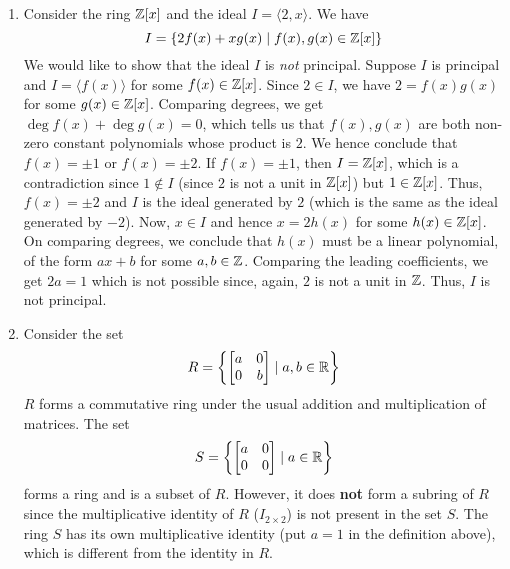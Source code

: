 \begin{ex}
\begin{enumerate}
    \item Consider the ring $\mathbb{Z}[x]$ and the ideal $I = \langle 2,x \rangle$. We have
    \[
        I = \left\{ 2 f(x) + x g(x) \mid f(x), g(x) \in \mathbb{Z}[x] \right\}
    \]
    We would like to show that the ideal $I$ is \emph{not} principal. Suppose $I$ is principal and $I = \langle f(x) \rangle$ for some $f(x) \in \mathbb{Z}[x]$. Since $2 \in I$, we have $2 = f(x) g(x)$ for some $g(x) \in \mathbb{Z}[x]$. Comparing degrees, we get $\deg f(x) + \deg g(x) = 0$, which tells us that $f(x), g(x)$ are both non-zero constant polynomials whose product is $2$. We hence conclude that $f(x) = \pm 1$ or $f(x) = \pm 2$. If $f(x) = \pm 1$, then $I = \mathbb{Z}[x]$, which is a contradiction since $1 \notin I$ (since $2$ is not a unit in $\mathbb{Z}[x]$) but $1 \in \mathbb{Z}[x]$. Thus, $f(x) = \pm 2$ and $I$ is the ideal generated by $2$ (which is the same as the ideal generated by $-2$). Now, $x \in I$ and hence $x = 2 h(x)$ for some $h(x) \in \mathbb{Z}[x]$. On comparing degrees, we conclude that $h(x)$ must be a linear polynomial, of the form $ax + b$ for some $a,b \in \mathbb{Z}$. Comparing the leading coefficients, we get $2a = 1$ which is not possible since, again, $2$ is not a unit in $\mathbb{Z}$. Thus, $I$ is not principal.
    
    \item Consider the set
    \[
        R = \left\{ \begin{bmatrix}
            a & 0 \\
            0 & b
        \end{bmatrix} \mid a,b \in \mathbb{R} \right\}
    \]
    $R$ forms a commutative ring under the usual addition and multiplication of matrices. The set
    \[
        S = \left\{ \begin{bmatrix}
            a & 0 \\
            0 & 0
        \end{bmatrix} \mid a \in \mathbb{R} \right\}
    \]
    forms a ring and is a subset of $R$. However, it does \textbf{not} form a subring of $R$ since the multiplicative identity of $R$ ($I_{2 \times 2}$) is not present in the set $S$. The ring $S$ has its own multiplicative identity (put $a = 1$ in the definition above), which is different from the identity in $R$.
\end{enumerate}
\end{ex}